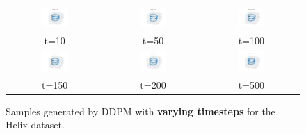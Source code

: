 \documentclass[11pt]{article}
\begin{document}
\begin{figure}[ht]
    \centering
    \begin{tabular}{ccc}
        \includegraphics[width=0.3\textwidth]{exps/ddpm_3_10_0.0001_0.02_helix/samples_10.png} &
        \includegraphics[width=0.3\textwidth]{exps/ddpm_3_50_0.0001_0.02_helix/samples_50.png} &
        \includegraphics[width=0.3\textwidth]{exps/ddpm_3_100_0.0001_0.02_helix/samples_100.png} \\
        t=10 & t=50 & t=100 \\[0.5em]
        
        \includegraphics[width=0.3\textwidth]{exps/ddpm_3_150_0.0001_0.02_helix/samples_150.png} &
        \includegraphics[width=0.3\textwidth]{exps/ddpm_3_200_0.0001_0.02_helix/samples_200.png} &
        \includegraphics[width=0.3\textwidth]{exps/ddpm_3_500_0.0001_0.02_helix/samples_500.png} \\
        t=150 & t=200 & t=500 \\
    \end{tabular}
    \caption{Samples generated by DDPM with \textbf{varying timesteps} for the Helix dataset.}
    \label{fig:timesteps_helix}
\end{figure}
\end{document}

